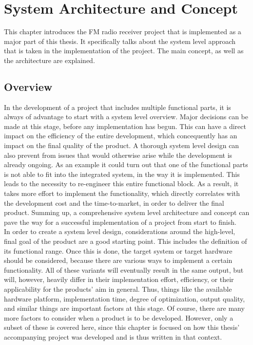 \chapter{System Architecture and Concept}
\label{cha:SystemArchitectureAndConcept}

This chapter introduces the FM radio receiver project that is implemented as a major part of this thesis.
It specifically talks about the system level approach that is taken in the implementation of the project.
The main concept, as well as the architecture are explained.

\section{Overview}

In the development of a project that includes multiple functional parts, it is always of advantage to start with a system level overview.
Major decisions can be made at this stage, before any implementation has begun.
This can have a direct impact on the efficiency of the entire development, which concequently has an impact on the final quality of the product.
A thorough system level design can also prevent from issues that would otherwise arise while the development is already ongoing.
As an example it could turn out that one of the functional parts is not able to fit into the integrated system, in the way it is implemented.
This leads to the necessity to re-engineer this entire functional block.
As a result, it takes more effort to implement the functionality, which directly correlates with the development cost and the time-to-market, in order to deliver the final product.
Summing up, a comprehensive system level architecture and concept can pave the way for a successful implementation of a project from start to finish.\\

In order to create a system level design, considerations around the high-level, final goal of the product are a good starting point.
This includes the definition of its functional range.
Once this is done, the target system or target hardware should be considered, because there are various ways to implement a certain functionality.
All of these variants will eventually result in the same output, but will, however, heavily differ in their implementation effort, efficiency, or their applicability for the products' aim in general.
Thus, things like the available hardware platform, implementation time, degree of optimization, output quality, and similar things are important factors at this stage.
Of course, there are many more factors to consider when a product is to be developed.
However, only a subset of these is covered here, since this chapter is focused on how this thesis' accompanying project was developed and is thus written in that context.\\

